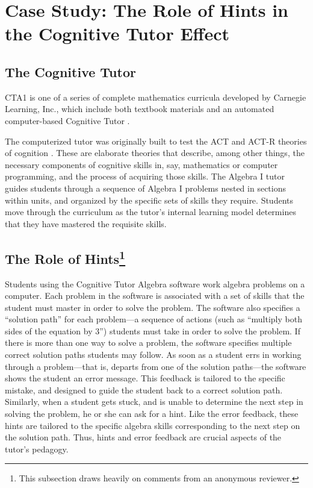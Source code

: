 \documentclass{article}\usepackage[]{graphicx}\usepackage[]{color}
\begin{document}
\section{Case Study: The Role of Hints in the Cognitive Tutor Effect}

\subsection{The Cognitive Tutor}
CTA1 is one of a series of complete mathematics curricula developed by
Carnegie Learning, Inc., which include both textbook materials and an
automated computer-based Cognitive Tutor
\citep{anderson1995cognitive,pane2014effectiveness}.

The computerized tutor was originally built to test the ACT and ACT-R
theories of cognition \citep{anderson2013architecture}.
These are elaborate theories that describe, among other things, the necessary components of
cognitive skills in, say, mathematics or computer programming, and the
process of acquiring those skills.
The Algebra I tutor guides students through a sequence of Algebra I
problems nested in sections within units, and organized by the specific sets of skills they require.
Students move through the curriculum as the tutor's internal learning
model determines that they have mastered the requisite skills.


\subsection{The Role of Hints\footnote{This subsection draws heavily
  on comments from an anonymous reviewer.}}
Students using the Cognitive Tutor Algebra software work algebra
problems on a computer.
Each problem in the software is associated with a set of skills that
the student must master in order to solve the problem.
The software also specifies a ``solution path'' for each problem---a sequence
of actions (such as ``multiply both sides of the equation by 3'')
students must take in order to solve the problem.
If there is more than one way to solve a problem, the software specifies
multiple correct solution paths students may follow.
As soon as a student errs in working through a problem---that is, departs from one of the
solution paths---the software shows the student an error message.
This feedback is tailored to the specific mistake, and
designed to guide the student back to a correct solution path.
Similarly, when a student gets stuck, and is unable to determine the
next step in solving the problem, he or she can ask for a hint.
Like the error feedback, these hints are tailored to the specific
algebra skills corresponding to the next step on the solution path.
Thus, hints and error feedback are crucial aspects of the tutor's
pedagogy.
\end{document}
